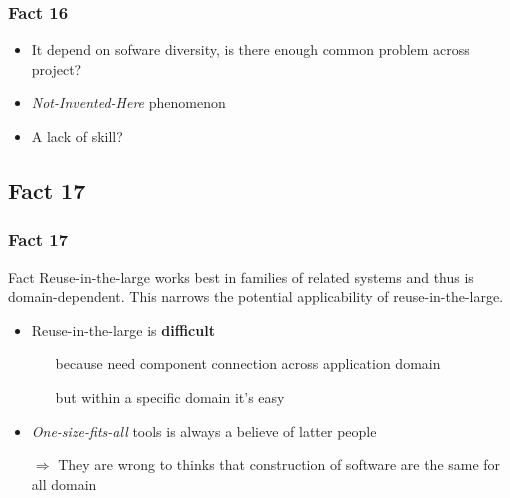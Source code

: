 \documentclass{beamer}
\begin{document}
\begin{frame}
	\frametitle{Fact 16}
	\begin{itemize}
		\item It depend on sofware diversity, is there enough common problem across project?
		\item \textit{Not-Invented-Here} phenomenon
		\item A lack of skill?
	\end{itemize}

\end{frame}

\subsection{Fact 17}
\begin{frame}
    \frametitle{Fact 17}
    \begin{block}{Fact}
    Reuse-in-the-large works best in families of related systems and thus is
    domain-dependent. This narrows the potential applicability of
    reuse-in-the-large.
    \end{block}

    \begin{itemize}

    \item Reuse-in-the-large is \textbf{difficult}
    \begin{itemize}
        \item[\alert{because}] need component connection across
            application domain
        \item[\alert{but}] within a specific domain it's easy
    \end{itemize}

    \item \textit{One-size-fits-all} tools is always a believe of latter
    people

        $\Rightarrow$ They are wrong to thinks that construction of
        software are the same for all domain

        \end{itemize}

\end{frame}
\end{document}
